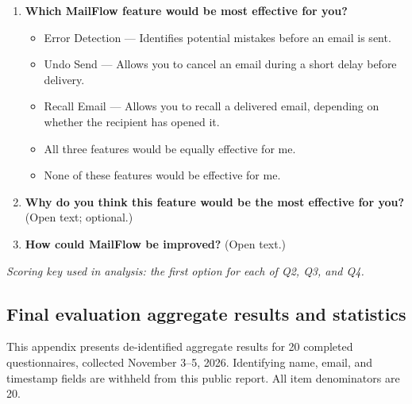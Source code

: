 \documentclass[letterpaper]{jdf}
\begin{document}
\begin{enumerate}
\begin{enumerate}
\item The design is easy to understand.
\item I would feel in control when using this design.
\item This design would be useful in my email application.
\item The warnings help me identify and correct mistakes before sending.
\item The difference between Undo Send and Recall is clear to me.
\end{enumerate}
Response scale: 1 = Strongly disagree; 2 = Disagree; 3 = Neutral; 4 = Agree; 5 = Strongly agree.
\item \textbf{Which MailFlow feature would be most effective for you?}
\begin{itemize}
\item Error Detection --- Identifies potential mistakes before an email is sent.
\item Undo Send --- Allows you to cancel an email during a short delay before delivery.
\item Recall Email --- Allows you to recall a delivered email, depending on whether the recipient has opened it.
\item All three features would be equally effective for me.
\item None of these features would be effective for me.
\end{itemize}
\item \textbf{Why do you think this feature would be the most effective for you?}
(Open text; optional.)
\item \textbf{How could MailFlow be improved?}
(Open text.)
\end{enumerate}
\noindent\textit{Scoring key used in analysis: the first option for each of Q2, Q3, and Q4.}

\subsection{Final evaluation aggregate results and statistics}\label{app:final-evaluation-results}
This appendix presents de-identified aggregate results for 20 completed questionnaires, collected November 3--5, 2026. Identifying name, email, and timestamp fields are withheld from this public report. All item denominators are 20.
\end{document}
